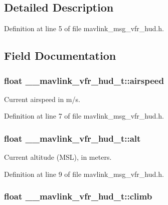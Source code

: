 \subsection{Detailed Description}


Definition at line 5 of file mavlink\-\_\-msg\-\_\-vfr\-\_\-hud.\-h.



\subsection{Field Documentation}
\hypertarget{struct____mavlink__vfr__hud__t_a78714d39e0dd6db7448c6633442a9e00}{
\subsubsection[{airspeed}]{\setlength{\rightskip}{0pt plus 5cm}float \-\_\-\-\_\-mavlink\-\_\-vfr\-\_\-hud\-\_\-t\-::airspeed}}\label{struct____mavlink__vfr__hud__t_a78714d39e0dd6db7448c6633442a9e00}


Current airspeed in m/s. 



Definition at line 7 of file mavlink\-\_\-msg\-\_\-vfr\-\_\-hud.\-h.

\hypertarget{struct____mavlink__vfr__hud__t_a7a6c968281e1518a001e32e24424a8da}{
\subsubsection[{alt}]{\setlength{\rightskip}{0pt plus 5cm}float \-\_\-\-\_\-mavlink\-\_\-vfr\-\_\-hud\-\_\-t\-::alt}}\label{struct____mavlink__vfr__hud__t_a7a6c968281e1518a001e32e24424a8da}


Current altitude (M\-S\-L), in meters. 



Definition at line 9 of file mavlink\-\_\-msg\-\_\-vfr\-\_\-hud.\-h.

\hypertarget{struct____mavlink__vfr__hud__t_a3b87f500e3394aef4c26d05435f1e7ba}{
\subsubsection[{climb}]{\setlength{\rightskip}{0pt plus 5cm}float \-\_\-\-\_\-mavlink\-\_\-vfr\-\_\-hud\-\_\-t\-::climb}}\label{struct____mavlink__vfr__hud__t_a3b87f500e3394aef4c26d05435f1e7ba}


